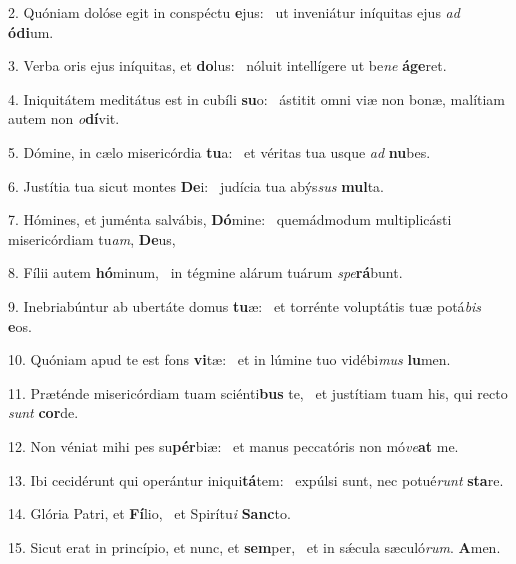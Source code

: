 2. Quóniam dolóse egit in conspéctu \textbf{e}jus: \ast\  ut inveniátur iníquitas ejus \textit{ad} \textbf{ó}\textbf{di}um.\

3. Verba oris ejus iníquitas, et \textbf{do}lus: \ast\  nóluit intellígere ut be\textit{ne} \textbf{á}\textbf{ge}ret.\

4. Iniquitátem meditátus est in cubíli \textbf{su}o: \ast\  ástitit omni viæ non bonæ, malítiam autem non \textit{o}\textbf{dí}vit.\

5. Dómine, in cælo misericórdia \textbf{tu}a: \ast\  et véritas tua usque \textit{ad} \textbf{nu}bes.\

6. Justítia tua sicut montes \textbf{De}i: \ast\  judícia tua abýs\textit{sus} \textbf{mul}ta.\

7. Hómines, et juménta salvábis, \textbf{Dó}mine: \ast\  quemádmodum multiplicásti misericórdiam tu\textit{am}, \textbf{De}us,\

8. Fílii autem \textbf{hó}minum, \ast\  in tégmine alárum tuárum \textit{spe}\textbf{rá}bunt.\

9. Inebriabúntur ab ubertáte domus \textbf{tu}æ: \ast\  et torrénte voluptátis tuæ potá\textit{bis} \textbf{e}os.\

10. Quóniam apud te est fons \textbf{vi}tæ: \ast\  et in lúmine tuo vidébi\textit{mus} \textbf{lu}men.\

11. Præténde misericórdiam tuam sciénti\textbf{bus} te, \ast\  et justítiam tuam his, qui recto \textit{sunt} \textbf{cor}de.\

12. Non véniat mihi pes su\textbf{pér}biæ: \ast\  et manus peccatóris non mó\textit{ve}\textbf{at} me.\

13. Ibi cecidérunt qui operántur iniqui\textbf{tá}tem: \ast\  expúlsi sunt, nec potué\textit{runt} \textbf{sta}re.\

14. Glória Patri, et \textbf{Fí}lio, \ast\  et Spirítu\textit{i} \textbf{Sanc}to.\

15. Sicut erat in princípio, et nunc, et \textbf{sem}per, \ast\  et in sǽcula sæculó\textit{rum}. \textbf{A}men.\

